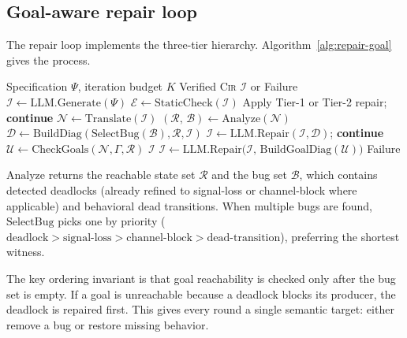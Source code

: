 \documentclass{article}
\begin{document}
\subsection{Goal-aware repair loop}
\label{subsec:repair-loop}

The repair loop implements the three-tier hierarchy. Algorithm~\ref{alg:repair-goal} gives the process.

\begin{algorithm}[t]
\caption{Goal-Aware Generate-Verify-Repair Loop}
\label{alg:repair-goal}
\begin{algorithmic}[1]
\Require Specification $\Psi$, iteration budget $K$
\Ensure  Verified \textsc{Cir} $\mathcal{I}$ or Failure
\State $\mathcal{I} \gets \text{LLM.Generate}(\Psi)$
    \State $\mathcal{E} \gets \text{StaticCheck}(\mathcal{I})$
        \State Apply Tier-1 or Tier-2 repair; \textbf{continue}
    \EndIf
    \State $\mathcal{N} \gets \text{Translate}(\mathcal{I})$
    \State $(\mathcal{R},\,\mathcal{B})
      \gets \text{Analyze}(\mathcal{N})$
        \State $\mathcal{D} \gets
          \text{BuildDiag}(\text{SelectBug}(\mathcal{B}),
            \mathcal{R},\mathcal{I})$
        \State $\mathcal{I} \gets
          \text{LLM.Repair}(\mathcal{I},\mathcal{D})$;
          \textbf{continue}
    \EndIf
    \State $\mathcal{U} \gets
      \text{CheckGoals}(\mathcal{N},\Gamma,\mathcal{R})$
        \Return $\mathcal{I}$
    \EndIf
    \State $\mathcal{I} \gets
      \text{LLM.Repair}\bigl(\mathcal{I},\,
        \text{BuildGoalDiag}(\mathcal{U})\bigr)$
\EndFor
\State \Return Failure
\end{algorithmic}
\end{algorithm}

$\text{Analyze}$ returns the reachable state set $\mathcal{R}$ and the bug set $\mathcal{B}$, which contains detected deadlocks (already refined to signal-loss or channel-block where applicable) and behavioral dead transitions. When multiple bugs are found, $\text{SelectBug}$ picks one by priority ($\text{deadlock}>\text{signal-loss}>\text{channel-block}> \text{dead-transition}$), preferring the shortest witness.

The key ordering invariant is that goal reachability is checked only after the bug set is empty. If a goal is unreachable because a deadlock blocks its producer, the deadlock is repaired first. This gives every round a single semantic target: either remove a bug or restore missing behavior.
\end{document}
